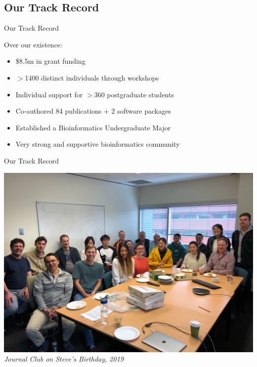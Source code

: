 \documentclass[11pt]{beamer}
\begin{document}
\subsection{Our Track Record}

\begin{frame}{Our Track Record}

Over our existence:

	\begin{itemize}
		\item \$8.5m in grant funding
		\item $>$1400 distinct individuals through workshops
		\item Individual support for $>$360 postgraduate students
		\item Co-authored 84 publications + 2 software packages
		\item Established a Bioinformatics Undergraduate Major
		\item Very strong and supportive bioinformatics community\\[5mm]
	\end{itemize}

\end{frame}

\begin{frame}{Our Track Record}

\small
\center
\includegraphics[width=0.75\linewidth]{figures/HubMeetingRoom.jpg}\\
\textit{Journal Club on Steve's Birthday, 2019}\\[1cm]

\end{frame}
\end{document}
